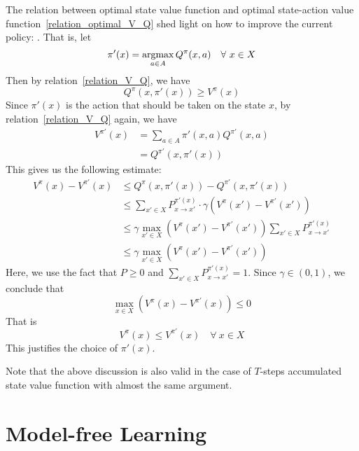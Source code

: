 The relation between optimal state value function and optimal state-action value 
function~\eqref{relation_optimal_V_Q} shed light on how to improve the current policy: . That is, let 
\begin{equation}
\pi'(x) = \operatorname*{argmax}_{a \in A}Q^\pi(x, a)\quad\forall~x \in X
\end{equation}
Then by relation~\eqref{relation_V_Q}, we have
$$Q^\pi(x, \pi'(x)) \geq V^\pi(x)$$
Since $\pi'(x)$ is the action that should be taken on the state $x$, by relation~\eqref{relation_V_Q} again, 
we have
\begin{align*}
    V^{\pi'}(x) &= \sum_{a \in A}\pi'(x, a) Q^{\pi'}(x, a)\\
              &= Q^{\pi'}(x, \pi'(x))
\end{align*}
This gives us the following estimate:
\begin{align*}
    V^\pi(x) - V^{\pi'}(x) &\leq Q^\pi(x, \pi'(x)) - Q^{\pi'}(x, \pi'(x))\\
                           &\leq \sum_{x' \in X}P_{x \rightarrow x'}^{\pi'(x)}\cdot\gamma\left(V^\pi(x') - 
                           V^{\pi'}(x')\right)\\
                           &\leq \gamma \max_{x' \in X}\left(V^\pi(x') - V^{\pi'}(x')\right)\sum_{x' \in X}
                           P_{x \rightarrow x'}^{\pi'(x)}\\
                           &\leq \gamma \max_{x' \in X}\left(V^\pi(x') - V^{\pi'}(x')\right)
\end{align*}
Here, we use the fact that $P \geq 0$ and $\sum_{x' \in X}P_{x \rightarrow x'}^{\pi'(x)} = 1$. Since
$\gamma \in (0, 1)$, we conclude that
$$\max_{x \in X}\left(V^\pi(x) - V^{\pi'}(x)\right) \leq 0$$
That is 
$$V^\pi(x) \leq V^{\pi'}(x)\quad\forall~x \in X$$
This justifies the choice of $\pi'(x)$.
\begin{re}
    Note that the above discussion is also valid in the case of $T$-steps accumulated state value function
    with almost the same argument.
\end{re}



\section{Model-free Learning}